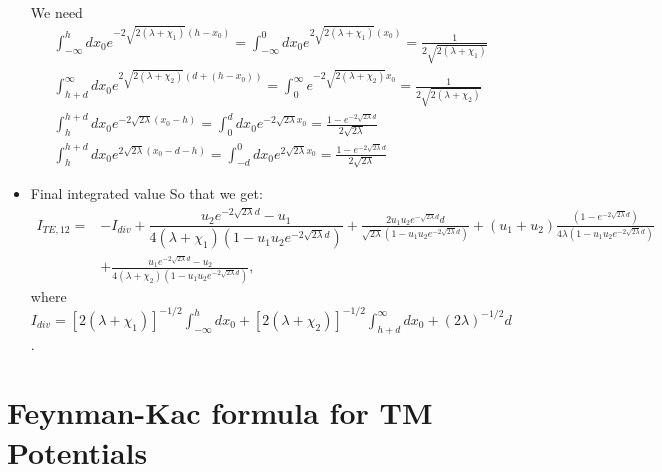 \begin{itemize}
     We need 
    \begin{gather}
      \int_{-\infty}^h dx_0 e^{-2\sqrt{2(\lambda+\chi_1)}(h-x_0)} = \int_{-\infty}^0 dx_0 e^{2\sqrt{2(\lambda+\chi_1)}(x_0)} = \frac{1}{2\sqrt{2(\lambda+\chi_1)}}\\
      \int_{h+d}^\infty dx_0 e^{2\sqrt{2(\lambda+\chi_2)}(d+(h-x_0))} = \int_0^\infty e^{-2\sqrt{2(\lambda+\chi_2)}x_0} = \frac{1}{2\sqrt{2(\lambda+\chi_2)}}\\
      \int_{h}^{h+d} dx_0 e^{-2\sqrt{2\lambda}(x_0-h)} = \int_0^d  dx_0 e^{-2\sqrt{2\lambda}x_0} = \frac{1 - e^{-2\sqrt{2\lambda}d}}{2\sqrt{2\lambda}}\\
      \int_{h}^{h+d} dx_0 e^{2\sqrt{2\lambda}(x_0-d-h)} = \int_{-d}^0  dx_0 e^{2\sqrt{2\lambda}x_0} = \frac{1 - e^{-2\sqrt{2\lambda}d}}{2\sqrt{2\lambda}}
    \end{gather}
   \item Final integrated value
    So that we get:
    \begin{align}
      I_{TE,12} =& -I_{div} + \dfrac{u_2 e^{-2\sqrt{2\lambda}d}-u_1}{4(\lambda+\chi_1)(1-u_1u_2 e^{-2\sqrt{2\lambda}d})} +\frac{2u_1u_2 e^{-\sqrt{2\lambda}d}d}{\sqrt{2\lambda}(1-u_1u_2 e^{-2\sqrt{2\lambda}d})} + (u_1+u_2)\frac{(1-e^{-2\sqrt{2\lambda}d})}{4\lambda(1-u_1u_2e^{-2\sqrt{2\lambda}d})}\nonumber\\
      & +\frac{u_1 e^{-2\sqrt{2\lambda}d} - u_2}{4(\lambda+\chi_2)(1-u_1u_2 e^{-2\sqrt{2\lambda}d})},
    \end{align}
    where $I_{div} = [2(\lambda+\chi_1)]^{-1/2}\int_{-\infty}^h dx_0  +  [2(\lambda+\chi_2)]^{-1/2}\int_{h+d}^\infty dx_0  + (2\lambda)^{-1/2}d$.
\end{itemize}

\section{Feynman-Kac formula for TM Potentials}

